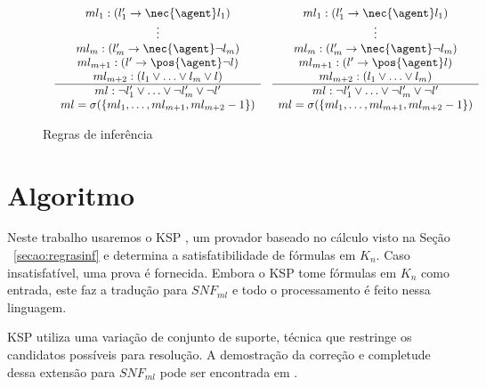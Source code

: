 \begin{figure*}[t]
\[\begin{array}{c}
\begin{array}{ll}
	\begin{array}{c}
	ml_1: (l_1' \rightarrow \nec{\agent} l_1) \\
	\vdots \\
	ml_m: (l_m' \rightarrow \nec{\agent} \neg l_m) \\
	ml_{m+1}: (l' \rightarrow \pos{\agent} \neg l) \\
	ml_{m+2}: (l_1 \lor \ldots \lor l_m \lor l) \\
	\hline
	ml: \neg l_1' \lor \ldots \lor \neg l_m' \lor \neg l' \\
	ml = \sigma(\{ml_1, \ldots, ml_{m+1}, ml_{m+2}-1\}) \\
	\end{array}
	&
	\begin{array}{c}
	ml_1: (l_1' \rightarrow \nec{\agent} l_1) \\
	\vdots \\
	ml_m: (l_m' \rightarrow \nec{\agent} \neg l_m) \\
	ml_{m+1}: (l' \rightarrow \pos{\agent} l) \\
	ml_{m+2}: (l_1 \lor \ldots \lor l_m) \\
	\hline
	ml: \neg l_1' \lor \ldots \lor \neg l_m' \lor \neg l' \\
	ml = \sigma(\{ml_1, \ldots, ml_{m+1}, ml_{m+2}-1\}) \\
	\end{array}
	
	\\ \end{array} \\
	\end{array} 
	\]
	\caption{Regras de inferência}
	\label{figura:regrasinf}
\end{figure*}



\section{Algoritmo}
Neste trabalho usaremos o KSP \cite{Nalon2020}, um provador baseado no cálculo visto na Seção ~\ref{secao:regrasinf} e determina a satisfatibilidade de fórmulas em $K_n$. Caso insatisfatível, uma prova é fornecida. Embora o KSP tome fórmulas em $K_n$ como entrada, este faz a tradução para $SNF_{ml}$ e todo o processamento é feito nessa linguagem.

KSP utiliza uma variação de conjunto de suporte, técnica que restringe os candidatos possíveis para resolução. A demostração da correção e completude dessa extensão para $SNF_{ml}$ pode ser encontrada em \cite{nalontocl}.


